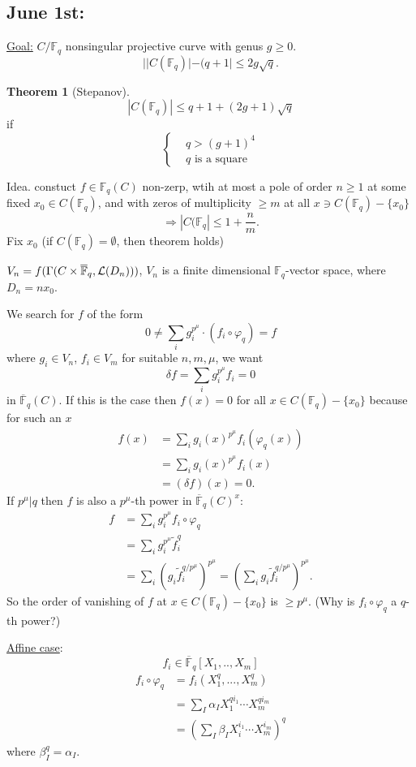 \documentclass[11pt]{article}
\theoremstyle{definition}
\newtheorem{thm}{Theorem}[section]
\newcommand{\bbf}{\mathbb F}
\newcommand{\call}{{\cal L}}
\newcommand{\Lrta}{\Longrightarrow}
\begin{document}
\subsection{June 1st:}
\underline{Goal:} $C/\bbf_q$ nonsingular projective curve with genus $g\geq 0$.
$$
||C(\bbf_q)|-(q+1|\leq 2g \sqrt{q}.
$$
\begin{thm}
[Stepanov]
$$
|C(\bbf_q)|\leq q+1+(2g+1)\sqrt{q}
$$
if 
$$
\left\{\begin{aligned}
&q> (g+1)^4\\
&q \text{ is a square}
\end{aligned}\right.
$$
\end{thm}

Idea. constuct $f\in \bbf_q(C)$ non-zerp, wtih at most a pole of order $n\geq 1$ at some fixed  $x_0\in C(\bbf_q)$, and with zeros of multiplicity $\geq m$ at all $x\ni C(\bbf_q)-\{x_0\}$
$$
\Lrta |C(\bbf_q|\leq 1+\frac{n}{m}.
$$
Fix $x_0$ (if $C(\bbf_q)=\emptyset$, then theorem holds)

$V_n=f(\Gamma(C\times \overline{\bbf}_q,\call(D_n)))$, $V_n$ is a finite  dimensional $\bbf_q$-vector space, where $D_n=n x_0$.

We search for $f$ of the form 
$$
0\neq \sum_i g_i^{p^{\mu}}\cdot (f_i\circ \varphi_q)=f
$$
where $g_i\in V_n$, $f_i\in V_m$ for suitable $n,m,\mu$, we want
$$
\delta f=\sum_i g_i^{p^\mu} f_i
=0$$
in $\overline{\bbf}_q(C)$. If this is the case then $f(x)=0$ for all $x\in C(\bbf_q)-\{x_0\}$ because  for such an $x$ 
$$
\begin{aligned}
f(x)&=\sum_i g_i(x)^{p^\mu} f_i (\varphi_q(x))\\
&=\sum_i g_i(x)^{p^\mu}f_i(x)\\
&=(\delta f)(x)=0.
\end{aligned}
$$
If $p^\mu|q$ then $f$ is also a $p^\mu$-th power in $\overline{\bbf}_q(C)^x$:
$$
\begin{aligned}
f&= \sum_i g_i^{p^\mu} f_i \circ \varphi_q\\
&= \sum_i g_i^{p^\mu} \tilde{f}_i^{q}\\
&=\sum_i (g_i \tilde{f}_i^{q/p^{\mu}})^{p^{\mu}}=\left(\sum_i g_i \tilde{f}_i^{q/p^\mu}\right)^{p^\mu}.
\end{aligned}
$$
So the order of vanishing of $f$ at $x\in C(\bbf_q)-\{x_0\}$ is $\geq p^\mu$.
(Why is $f_i\circ \varphi_q$ a $q$-th power?)

\underline{Affine case}:
$$
f_i\in\overline{\bbf}_q[X_1,..,X_m]
$$
$$
\begin{aligned}
f_i\circ \varphi_q&=f_i(X_1^q,...,X_m^q)\\
& =\sum_{I}\alpha_I X_1^{ q i_1}\cdots X_m^{q i_m}\\
&= \left(\sum_I \beta_I X_i^{i_1}\cdots X_m^{i_m}\right)^q
\end{aligned}
$$
where $\beta_I^q=\alpha_I$.
\end{document}
